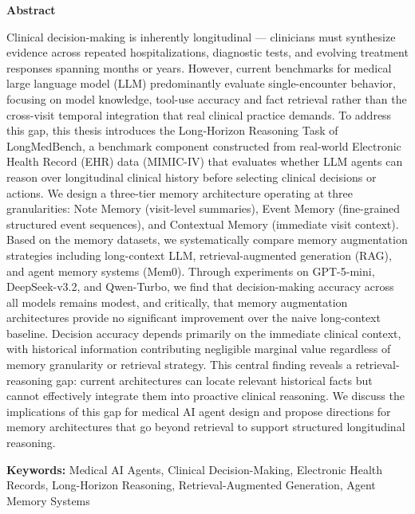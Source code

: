 \centerline{\xiaoyi\bfseries Abstract}

Clinical decision-making is inherently longitudinal — clinicians must synthesize evidence across repeated hospitalizations, diagnostic tests, and evolving treatment responses spanning months or years. However, current benchmarks for medical large language model (LLM) predominantly evaluate single-encounter behavior, focusing on model knowledge, tool-use accuracy and fact retrieval rather than the cross-visit temporal integration that real clinical practice demands. To address this gap, this thesis introduces the Long-Horizon Reasoning Task of LongMedBench, a benchmark component constructed from real-world Electronic Health Record (EHR) data (MIMIC-IV) that evaluates whether LLM agents can reason over longitudinal clinical history before selecting clinical decisions or actions. We design a three-tier memory architecture operating at three granularities: Note Memory (visit-level summaries), Event Memory (fine-grained structured event sequences), and Contextual Memory (immediate visit context). Based on the memory datasets, we systematically compare memory augmentation strategies including long-context LLM, retrieval-augmented generation (RAG), and agent memory systems (Mem0). Through experiments on GPT-5-mini, DeepSeek-v3.2, and Qwen-Turbo, we find that decision-making accuracy across all models remains modest, and critically, that memory augmentation architectures provide no significant improvement over the naive long-context baseline. Decision accuracy depends primarily on the immediate clinical context, with historical information contributing negligible marginal value regardless of memory granularity or retrieval strategy. This central finding reveals a retrieval-reasoning gap: current architectures can locate relevant historical facts but cannot effectively integrate them into proactive clinical reasoning. We discuss the implications of this gap for medical AI agent design and propose directions for memory architectures that go beyond retrieval to support structured longitudinal reasoning.

\vspace{2em}
\noindent\textbf{Keywords:} Medical AI Agents, Clinical Decision-Making, Electronic Health Records, Long-Horizon Reasoning, Retrieval-Augmented Generation, Agent Memory Systems

